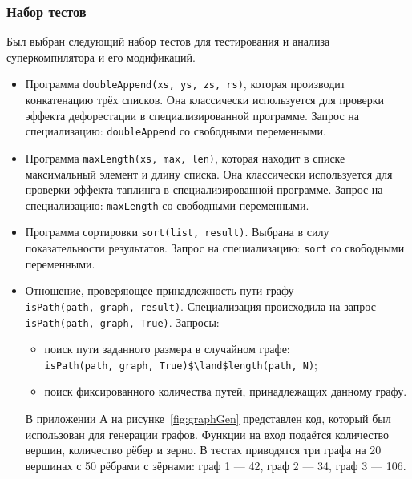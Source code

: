 \subsubsection{Набор тестов}

Был выбран следующий набор тестов для тестирования и анализа суперкомпилятора и его модификаций.
\begin{itemize}
 \item Программа \lstinline{doubleAppend(xs, ys, zs, rs)}, которая
       производит конкатенацию трёх списков. Она классически используется
       для проверки эффекта дефорестации в специализированной программе.
       Запрос на специализацию: \lstinline{doubleAppend} со свободными переменными.
 \item Программа \lstinline{maxLength(xs, max, len)}, которая находит в списке
       максимальный элемент и длину списка. Она классически используется
       для проверки эффекта таплинга в специализированной программе. 
       Запрос на специализацию: \lstinline{maxLength} со свободными переменными.
 \item Программа сортировки \lstinline{sort(list, result)}. Выбрана в силу показательности
       результатов.
       Запрос на специализацию: \lstinline{sort} со свободными переменными.
 \item Отношение, проверяющее принадлежность пути графу \\
       \lstinline{isPath(path, graph, result)}.
       Специализация происходила на запрос \lstinline{isPath(path, graph, True)}. Запросы:
       \begin{itemize}
       \item поиск пути заданного размера в случайном графе: \\
       \lstinline{isPath(path, graph, True)$\land$length(path, N)};
       \item поиск фиксированного количества путей, принадлежащих данному графу.
       \end{itemize}

	   В приложении А на рисунке~\ref{fig:graphGen} представлен код, который
	   был использован для генерации графов. Функции на вход
	   подаётся количество вершин, количество рёбер и зерно.
	   В тестах приводятся три графа на 20 вершинах с 50 рёбрами
	   с зёрнами: граф 1 --- 42, граф 2 --- 34, граф 3 --- 106.


\end{itemize}
